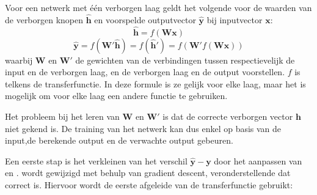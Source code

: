 Voor een netwerk met \'e\'en verborgen laag geldt het volgende voor de waarden van de verborgen knopen $\mathbf{\hat{h}}$ en voorspelde outputvector $\mathbf{\hat{y}}$ bij inputvector $\mathbf{x}$:
\begin{equation}
    \mathbf{\hat{h}} = f(\mathbf{Wx})
\end{equation}
\begin{equation}
    \boldsymbol{\hat{y}} = f(\boldsymbol{W'\hat{h}}) = f(\boldsymbol{\hat{h}'}) = f(\boldsymbol{W'}f(\boldsymbol{Wx}))
\end{equation}
waarbij $\mathbf{W}$ en $\mathbf{W'}$ de gewichten van de verbindingen tussen respectievelijk de input en de verborgen laag, en de verborgen laag en de output voorstellen. $f$ is telkens de transferfunctie. In deze formule is ze gelijk voor elke laag, maar het is mogelijk om voor elke laag een andere functie te gebruiken.

Het probleem bij het leren van $\mathbf{W}$ en $\mathbf{W'}$ is dat de correcte verborgen vector $\mathbf{h}$ niet gekend is. De training van het netwerk kan dus enkel op basis van de input,de  berekende output en de verwachte output gebeuren.

Een eerste stap is het verkleinen van het verschil $\mathbf{\hat{y}} - \mathbf{y}$ door het aanpassen van  en .  wordt gewijzigd met behulp van gradient descent, veronderstellende dat  correct is. Hiervoor wordt de eerste afgeleide van de transferfunctie gebruikt:

